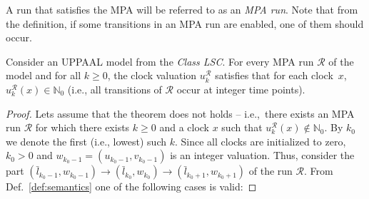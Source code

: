 A run that satisfies the MPA will be referred to as an \textit{MPA run}. Note that from the definition, if some transitions in an MPA run are enabled, one of them should occur. 

\begin{theorem}
\label{thm:basic_mpa}
Consider an UPPAAL model from the \textit{Class LSC}. For every MPA run $\mathcal{R}$ of the model
and for all $k\geq 0$, the clock valuation $u^{\mathcal{R}}_k$ satisfies that for each clock~$x$, $u^{\mathcal{R}}_k(x)\in \mathbb{N}_0$ (i.e., all transitions of $\mathcal{R}$ occur at integer time points).
\end{theorem}

\begin{proof}
Lets assume that the theorem does not holds -- i.e.,~there exists an MPA run $\mathcal{R}$ for which there exists $k\geq 0$ and a clock $x$ such that $u^{\mathcal{R}}_k(x)\notin \mathbb{N}_0$. By $k_0$ we denote the first (i.e., lowest) such $k$. Since all clocks are initialized to zero, $k_0>0$ and $w_{k_0-1}=(u_{k_0-1},v_{k_0-1})$ is an integer valuation. Thus, consider the part    
$(\bar{l}_{k_0-1},w_{k_0-1}) \rightarrow (\bar{l}_{k_0},w_{k_0}) \rightarrow (\bar{l}_{k_0+1},w_{k_0+1})$ of the run $\mathcal{R}$. From Def.~\ref{def:semantics} one of the following cases is valid:


\end{proof}
